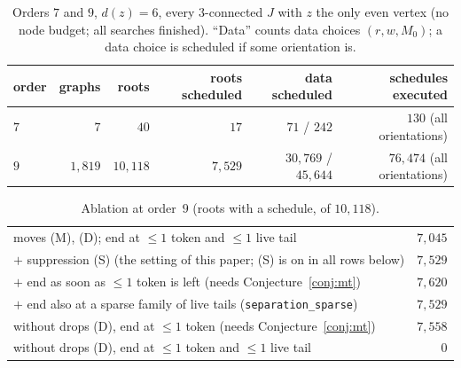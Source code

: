 \documentclass[11pt]{amsart}
\theoremstyle{definition}
\begin{document}
\begin{table}[ht]
\caption{Orders $7$ and $9$, $d(z)=6$, every $3$-connected $J$ with $z$ the only even vertex (no
node budget; all searches finished). ``Data'' counts data choices $(r,w,M_0)$; a data choice is
scheduled if some orientation is.}\label{tab:small}
\small
\begin{tabular}{@{}lrrrrr@{}}
\toprule
order & graphs & roots & roots scheduled & data scheduled & schedules executed\\
\midrule
$7$ & $7$ & $40$ & $17$ & $71$ / $242$ & $130$ (all orientations)\\
$9$ & $1{,}819$ & $10{,}118$ & $7{,}529$ & $30{,}769$ / $45{,}644$ & $76{,}474$ (all orientations)\\
\bottomrule
\end{tabular}
\end{table}

\begin{table}[ht]
\caption{Ablation at order~$9$ (roots with a schedule, of $10{,}118$).}\label{tab:ablate}
\small
\begin{tabular}{@{}lr@{}}
\toprule
moves (M), (D); end at $\le1$ token and $\le1$ live tail & $7{,}045$\\
$+$ suppression (S) (the setting of this paper; (S) is on in all rows below) & $7{,}529$\\
$+$ end as soon as $\le1$ token is left (needs Conjecture~\ref{conj:mt}) & $7{,}620$\\
$+$ end also at a sparse family of live tails (\texttt{separation\_sparse}) & $7{,}529$\\
without drops (D), end at $\le1$ token (needs Conjecture~\ref{conj:mt}) & $7{,}558$\\
without drops (D), end at $\le1$ token and $\le1$ live tail & $0$\\
\bottomrule
\end{tabular}
\end{table}
\end{document}
